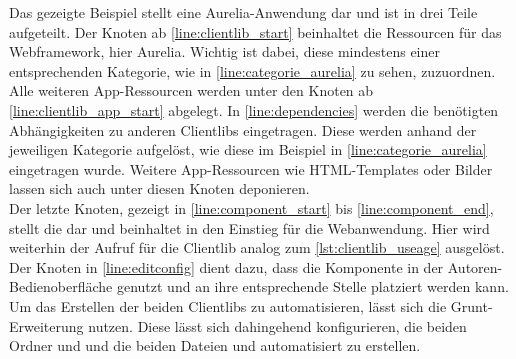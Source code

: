 Das gezeigte Beispiel stellt eine Aurelia-Anwendung dar und ist in drei Teile aufgeteilt. Der Knoten ab \autoref{line:clientlib_start}  beinhaltet die Ressourcen für das Webframework, hier Aurelia. Wichtig ist dabei, diese mindestens einer entsprechenden Kategorie, wie in \autoref{line:categorie_aurelia} zu sehen, zuzuordnen. \\
Alle weiteren App-Ressourcen werden unter den Knoten ab \autoref{line:clientlib_app_start} abgelegt. In \autoref{line:dependencies} werden die benötigten Abhängigkeiten zu anderen Clientlibs eingetragen. Diese werden anhand der jeweiligen Kategorie aufgelöst, wie diese im Beispiel in \autoref{line:categorie_aurelia} eingetragen wurde. Weitere App-Ressourcen wie HTML-Templates oder Bilder lassen sich auch unter diesen Knoten deponieren. \\
Der letzte Knoten, gezeigt in \autoref{line:component_start} bis \autoref{line:component_end}, stellt die \ajc dar und beinhaltet in  den Einstieg für die Webanwendung. Hier wird weiterhin der Aufruf für die Clientlib analog zum \autoref{lst:clientlib_useage} ausgelöst. Der Knoten in \autoref{line:editconfig} dient dazu, dass die Komponente in der Autoren-Bedienoberfläche genutzt und an ihre entsprechende Stelle platziert werden kann. \\
Um das Erstellen der beiden Clientlibs zu automatisieren, lässt sich die Grunt-Erweiterung  \cite{wcmio2017} nutzen. Diese lässt sich dahingehend konfigurieren, die beiden Ordner  und  und die beiden Dateien  und  automatisiert zu erstellen.